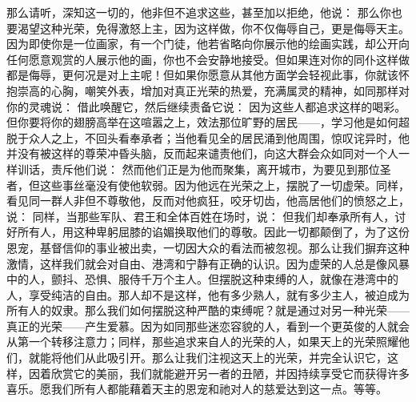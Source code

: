 那么请听，深知这一切的，他非但不追求这些，甚至加以拒绝，他说： 那么你也要渴望这种光荣，免得激怒上主，因为这样做，你不仅侮辱自己，更是侮辱天主。因为即使你是一位画家，有一个门徒，他若省略向你展示他的绘画实践，却公开向任何愿意观赏的人展示他的画，你也不会安静地接受。但如果连对你的同仆这样做都是侮辱，更何况是对上主呢！但如果你愿意从其他方面学会轻视此事，你就该怀抱崇高的心胸，嘲笑外表，增加对真正光荣的热爱，充满属灵的精神，如同那样对你的灵魂说： 借此唤醒它，然后继续责备它说： 因为这些人都追求这样的喝彩。但你要将你的翅膀高举在这喧嚣之上，效法那位旷野的居民——，学习他是如何超脱于众人之上，不回头看奉承者；当他看见全的居民涌到他周围，惊叹诧异时，他并没有被这样的尊荣冲昏头脑，反而起来谴责他们，向这大群会众如同对一个人一样训话，责斥他们说： 然而他们正是为他而聚集，离开城市，为要见到那位圣者，但这些事丝毫没有使他软弱。因为他远在光荣之上，摆脱了一切虚荣。同样，看见同一群人非但不尊敬他，反而对他疯狂，咬牙切齿，他高居他们的愤怒之上，说： 同样，当那些军队、君王和全体百姓在场时，说： 但我们却奉承所有人，讨好所有人，用这种卑躬屈膝的谄媚换取他们的尊敬。因此一切都颠倒了，为了这份恩宠，基督信仰的事业被出卖，一切因大众的看法而被忽视。那么让我们摒弃这种激情，这样我们就会对自由、港湾和宁静有正确的认识。因为虚荣的人总是像风暴中的人，颤抖、恐惧、服侍千万个主人。但摆脱这种束缚的人，就像在港湾中的人，享受纯洁的自由。那人却不是这样，他有多少熟人，就有多少主人，被迫成为所有人的奴隶。那么我们如何摆脱这种严酷的束缚呢？就是通过对另一种光荣——真正的光荣——产生爱慕。因为如同那些迷恋容貌的人，看到一个更英俊的人就会从第一个转移注意力；同样，那些追求来自人的光荣的人，如果天上的光荣照耀他们，就能将他们从此吸引开。那么让我们注视这天上的光荣，并完全认识它，这样，因着欣赏它的美丽，我们就能避开另一者的丑陋，并因持续享受它而获得许多喜乐。愿我们所有人都能藉着天主的恩宠和祂对人的慈爱达到这一点。等等。\par


